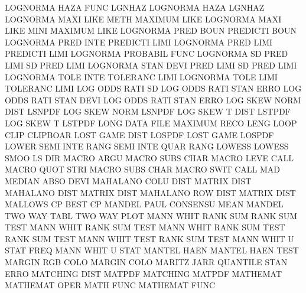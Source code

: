 LOGNORMA HAZA FUNC                      LGNHAZ
LOGNORMA HAZA                           LGNHAZ
LOGNORMA MAXI LIKE METH                 MAXIMUM  LIKE
LOGNORMA MAXI LIKE MINI                 MAXIMUM  LIKE
LOGNORMA PRED BOUN                      PREDICTI BOUN
LOGNORMA PRED INTE                      PREDICTI LIMI
LOGNORMA PRED LIMI                      PREDICTI LIMI
LOGNORMA                                PROBABIL FUNC
LOGNORMA SD   PRED LIMI                 SD       PRED LIMI
LOGNORMA STAN DEVI PRED LIMI            SD       PRED LIMI
LOGNORMA TOLE INTE                      TOLERANC LIMI
LOGNORMA TOLE LIMI                      TOLERANC LIMI
LOG      ODDS RATI SD                   LOG      ODDS RATI STAN ERRO
LOG      ODDS RATI STAN DEVI            LOG      ODDS RATI STAN ERRO
LOG      SKEW NORM DIST                 LSNPDF
LOG      SKEW NORM                      LSNPDF
LOG      SKEW T    DIST                 LSTPDF
LOG      SKEW T                         LSTPDF
LONG     DATA FILE                      MAXIMUM  RECO LENG
LOOP     CLIP                           CLIPBOAR
LOST     GAME DIST                      LOSPDF
LOST     GAME                           LOSPDF
LOWER    SEMI INTE RANG                 SEMI     INTE QUAR RANG
LOWESS                                  LOWESS   SMOO
LS                                      DIR
MACRO    ARGU                           MACRO    SUBS CHAR
MACRO    LEVE                           CALL
MACRO    QUOT STRI                      MACRO    SUBS CHAR
MACRO    SWIT                           CALL
MAD                                     MEDIAN   ABSO DEVI
MAHALANO COLU DIST                      MATRIX   DIST
MAHALANO DIST                           MATRIX   DIST
MAHALANO ROW  DIST                      MATRIX   DIST
MALLOWS  CP                             BEST     CP
MANDEL   PAUL                           CONSENSU MEAN
MANDEL   TWO  WAY  TABL                 TWO      WAY  PLOT
MANN     WHIT RANK SUM                  RANK     SUM  TEST
MANN     WHIT                           RANK     SUM  TEST
MANN     WHIT RANK SUM  TEST            RANK     SUM  TEST
MANN     WHIT TEST                      RANK     SUM  TEST
MANN     WHIT U    STAT FREQ            MANN     WHIT U    STAT
MANTEL   HAEN                           MANTEL   HAEN TEST
MARGIN   RGB  COLO                      MARGIN   COLO
MARITZ   JARR                           QUANTILE STAN ERRO
MATCHING DIST                           MATPDF
MATCHING                                MATPDF
MATHEMAT                                MATHEMAT OPER
MATH     FUNC                           MATHEMAT FUNC
